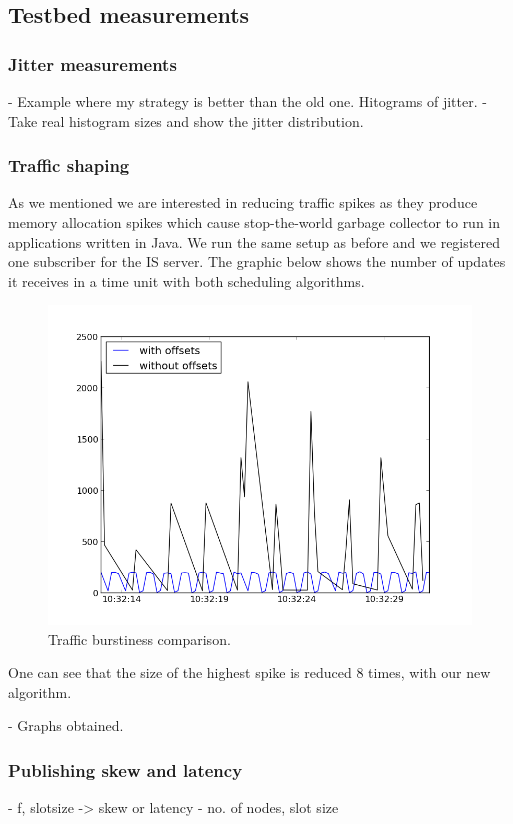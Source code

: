 \subsection*{Testbed measurements}
\subsubsection*{Jitter measurements}
- Example where my strategy is better than the old one. Hitograms of jitter.
- Take real histogram sizes and show the jitter distribution.

\subsubsection*{Traffic shaping}

As we mentioned we are interested in reducing traffic spikes as they produce memory allocation spikes which cause stop-the-world garbage collector to run in applications written in Java. We run the same setup as before and we registered one subscriber for the IS server. The graphic below shows the number of updates it receives in a time unit with both scheduling algorithms. 

\begin{figure}[H]
\centering
\includegraphics[scale=0.6]{Images/burstiness.png}
\caption{Traffic burstiness comparison.}
\end{figure}

One can see that the size of the highest spike is reduced 8 times, with our new algorithm.


- Graphs obtained.
\subsubsection*{Publishing skew and latency}
- f, slotsize -> skew or latency
- no. of nodes, slot size


